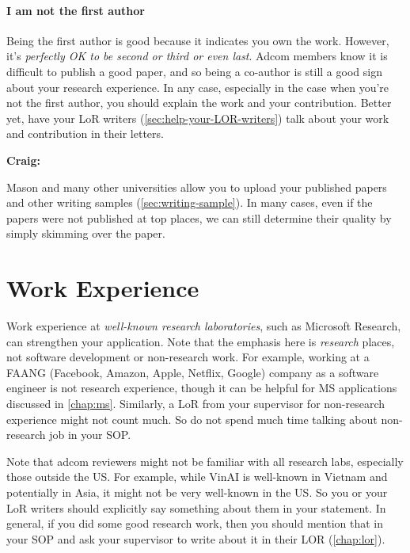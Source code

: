 \documentclass[oneside,11pt,dvipsnames]{book}
\newenvironment{commentbox}[1][]{
  \small
  \begin{mybox}
    {\small \textbf{#1}}
  }{
  \end{mybox}
}
\begin{document}

\paragraph{I am not the first author} Being the first author is good because it indicates you own the work. However, it's \emph{perfectly OK to be second or third or even last}.  Adcom members know it is difficult to publish a good paper, and so being a co-author is still a good sign about your research experience. In any case, especially in the case when you're not the first author, you should explain the work and your contribution.  Better yet, have your LoR writers (\autoref{sec:help-your-LOR-writers}) talk about your work and contribution in their letters.

\begin{commentbox}[Craig:]
  Mason and many other universities allow you to upload your published papers and other writing samples (\autoref{sec:writing-sample}). In many cases, even if the papers were not published at top places, we can still determine their quality by simply skimming over the paper.
\end{commentbox}



\section{Work Experience} Work experience at \emph{well-known research laboratories}, such as Microsoft Research, can strengthen your
application.  Note that the emphasis here is \emph{research} places, not software development or non-research work. For example, working at a FAANG (Facebook, Amazon, Apple, Netflix, Google) company as a software engineer is not research experience, though it can be helpful for MS applications discussed in \autoref{chap:ms}. Similarly, a LoR from your supervisor for non-research experience might not count much. So do not spend much time talking about non-research job in your SOP.


Note that adcom reviewers might not be familiar with all research labs, especially those outside the US. For example, while VinAI is  well-known in Vietnam and potentially in Asia, it might not be very well-known in the US. So you or your LoR writers should explicitly say something about them in your statement.  In general, if you did some good research work, then you should mention that in your SOP and ask your supervisor to write about it in their LOR (\autoref{chap:lor}).
\end{document}
